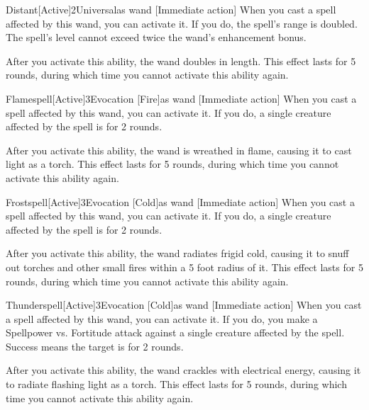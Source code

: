             \begin{magicitemdef}{Distant}[Active]{2}{Universal}{as wand}
                [Immediate action] When you cast a spell affected by this wand, you can activate it.
                If you do, the spell's range is doubled.
                The spell's level cannot exceed twice the wand's enhancement bonus.

                After you activate this ability, the wand doubles in length.
                This effect lasts for 5 rounds, during which time you cannot activate this ability again.
            \end{magicitemdef}

            \begin{magicitemdef}{Flamespell}[Active]{3}{Evocation [Fire]}{as wand}
                [Immediate action] When you cast a spell affected by this wand, you can activate it.
                If you do, a single creature affected by the spell is \ignited for 2 rounds.

                After you activate this ability, the wand is wreathed in flame, causing it to cast light as a torch.
                This effect lasts for 5 rounds, during which time you cannot activate this ability again.
            \end{magicitemdef}

            \begin{magicitemdef}{Frostspell}[Active]{3}{Evocation [Cold]}{as wand}
                [Immediate action] When you cast a spell affected by this wand, you can activate it.
                If you do, a single creature affected by the spell is \fatigued for 2 rounds.

                After you activate this ability, the wand radiates frigid cold, causing it to snuff out torches and other small fires within a 5 foot radius of it.
                This effect lasts for 5 rounds, during which time you cannot activate this ability again.
            \end{magicitemdef}

            \begin{magicitemdef}{Thunderspell}[Active]{3}{Evocation [Cold]}{as wand}
                [Immediate action] When you cast a spell affected by this wand, you can activate it.
                If you do, you make a Spellpower vs. Fortitude attack against a single creature affected by the spell.
                Success means the target is \staggered for 2 rounds.

                After you activate this ability, the wand crackles with electrical energy, causing it to radiate flashing light as a torch.
                This effect lasts for 5 rounds, during which time you cannot activate this ability again.
            \end{magicitemdef}

